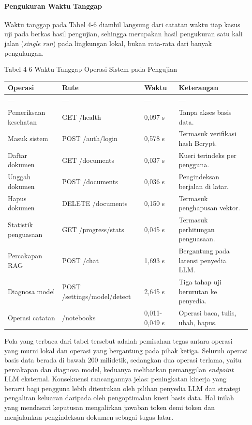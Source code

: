 \documentclass[12pt,a4paper]{article}
\begin{document}
\paragraph*{Pengukuran Waktu Tanggap}
Waktu tanggap pada Tabel 4-6 diambil langsung dari catatan waktu tiap kasus uji pada berkas hasil pengujian, sehingga merupakan hasil pengukuran satu kali jalan (\textit{single run}) pada lingkungan lokal, bukan rata-rata dari banyak pengulangan.

Tabel 4-6	Waktu Tanggap Operasi Sistem pada Pengujian

\begin{table}[h]
\centering
\begin{tabular}{llll}
\toprule
Operasi & Rute & Waktu & Keterangan \\
\midrule
--- & --- & --- & --- \\
Pemeriksaan kesehatan & GET /health & 0,097 s & Tanpa akses basis data. \\
Masuk sistem & POST /auth/login & 0,578 s & Termasuk verifikasi hash Bcrypt. \\
Daftar dokumen & GET /documents & 0,037 s & Kueri terindeks per pengguna. \\
Unggah dokumen & POST /documents & 0,036 s & Pengindeksan berjalan di latar. \\
Hapus dokumen & DELETE /documents & 0,150 s & Termasuk penghapusan vektor. \\
Statistik penguasaan & GET /progress/stats & 0,045 s & Termasuk perhitungan penguasaan. \\
Percakapan RAG & POST /chat & 1,693 s & Bergantung pada latensi penyedia LLM. \\
Diagnosa model & POST /settings/model/detect & 2,645 s & Tiga tahap uji berurutan ke penyedia. \\
Operasi catatan & /notebooks & 0,011-0,049 s & Operasi baca, tulis, ubah, hapus. \\
\bottomrule
\end{tabular}
\end{table}
Pola yang terbaca dari tabel tersebut adalah pemisahan tegas antara operasi yang murni lokal dan operasi yang bergantung pada pihak ketiga. Seluruh operasi basis data berada di bawah 200 milidetik, sedangkan dua operasi terlama, yaitu percakapan dan diagnosa model, keduanya melibatkan pemanggilan \textit{endpoint} LLM eksternal. Konsekuensi rancangannya jelas: peningkatan kinerja yang berarti bagi pengguna lebih ditentukan oleh pilihan penyedia LLM dan strategi pengaliran keluaran daripada oleh pengoptimalan kueri basis data. Hal inilah yang mendasari keputusan mengalirkan jawaban token demi token dan menjalankan pengindeksan dokumen sebagai tugas latar.
\end{document}

